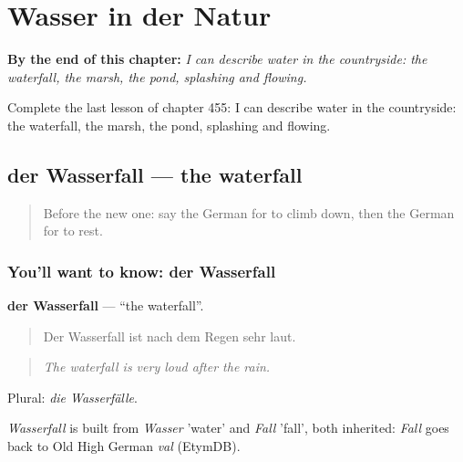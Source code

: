 
\chapter{Wasser in der Natur}
\label{ch:ge-wasser-in-der-natur}

\begin{chapteropening}
\textbf{By the end of this chapter:} \emph{I can describe water in the countryside: the waterfall, the marsh, the pond, splashing and flowing.}

Complete the last lesson of chapter 455: I can describe water in the countryside: the waterfall, the marsh, the pond, splashing and flowing.
\end{chapteropening}

\section[der Wasserfall]{der Wasserfall — the waterfall}

\label{lesson:GE-C455-wasserfall}



\begin{quote}
Before the new one: say the German for to climb down, then the German for to rest.
\end{quote}

\subsection*{You'll want to know: der Wasserfall}
\textbf{der Wasserfall} — \textquotedblleft{}the waterfall\textquotedblright{}.

\begin{quote}
Der Wasserfall ist nach dem Regen sehr laut.
\end{quote}

\begin{quote}
\emph{The waterfall is very loud after the rain.}
\end{quote}

Plural: \emph{die Wasserfälle}.

\begin{cousinweb}
\emph{Wasserfall} is built from \emph{Wasser} 'water' and \emph{Fall} 'fall', both inherited: \emph{Fall} goes back to Old High German \emph{val} (EtymDB).
\end{cousinweb}

